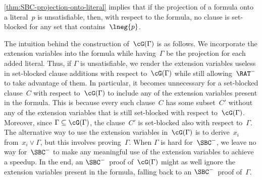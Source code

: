 \documentclass[10pt,a4paper]{article}
\begin{document}
\cref{thm:SBC-projection-onto-literal} implies that
if the projection of a formula onto a literal~$p$ is unsatisfiable,
then, with respect to the formula, no clause is set-blocked
for any set that contains~$\lneg{p}$.

The intuition behind the construction of~$\cG(\Gamma)$ is as follows.
We incorporate the extension variables
into the formula while having~$\Gamma$ be
the projection for each added literal.
Thus, if $\Gamma$ is unsatisfiable,
we render the extension variables useless
in set-blocked clause additions with respect to~$\cG(\Gamma)$
while still allowing~$\RAT^-$ to take advantage of them.
In particular, it becomes unnecessary for a set-blocked clause~$C$
with respect to~$\cG(\Gamma)$ to include
any of the extension variables present in the formula.
This is because every such clause~$C$ has some subset~$C'$
without any of the extension variables
that is still set-blocked with respect to~$\cG(\Gamma)$.
Moreover, since $\Gamma \subseteq \cG(\Gamma)$, the clause~$C'$
is set-blocked also with respect to~$\Gamma$.
The alternative way to use the extension variables in~$\cG(\Gamma)$
is to derive~$x_i$ from~$x_i \lor \Gamma$,
but this involves proving~$\Gamma$.
When $\Gamma$ is hard for~$\SBC^-$, we leave no way for~$\SBC^-$
to make any meaningful use of the extension variables to achieve a speedup.
In the end, an $\SBC^-$~proof of~$\cG(\Gamma)$ might as well
ignore the extension variables present in the formula,
falling back to an $\SBC^-$~proof of~$\Gamma$.
\end{document}
